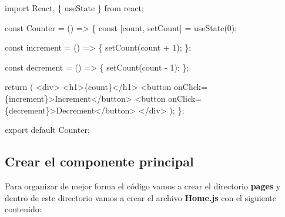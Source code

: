 \documentclass[
  a4paper,
  DIV=11,
  numbers=noendperiod,
  onepage,
  openany]{scrreprt}
\newenvironment{Shaded}{\begin{snugshade}}{\end{snugshade}}
\newcommand{\ControlFlowTok}[1]{\textcolor[rgb]{0.00,0.23,0.31}{#1}}
\newcommand{\DecValTok}[1]{\textcolor[rgb]{0.68,0.00,0.00}{#1}}
\newcommand{\FunctionTok}[1]{\textcolor[rgb]{0.28,0.35,0.67}{#1}}
\newcommand{\ImportTok}[1]{\textcolor[rgb]{0.00,0.46,0.62}{#1}}
\newcommand{\KeywordTok}[1]{\textcolor[rgb]{0.00,0.23,0.31}{#1}}
\newcommand{\NormalTok}[1]{\textcolor[rgb]{0.00,0.23,0.31}{#1}}
\newcommand{\OperatorTok}[1]{\textcolor[rgb]{0.37,0.37,0.37}{#1}}
\newcommand{\OtherTok}[1]{\textcolor[rgb]{0.00,0.23,0.31}{#1}}
\newcommand{\StringTok}[1]{\textcolor[rgb]{0.13,0.47,0.30}{#1}}
\newcommand{\VariableTok}[1]{\textcolor[rgb]{0.07,0.07,0.07}{#1}}
\begin{document}
\begin{Shaded}
\begin{Highlighting}[]
\ImportTok{import}\NormalTok{ React}\OperatorTok{,}\NormalTok{ \{ useState \} }\ImportTok{from} \StringTok{\textquotesingle{}react\textquotesingle{}}\OperatorTok{;}

\KeywordTok{const}\NormalTok{ Counter }\OperatorTok{=}\NormalTok{ () }\KeywordTok{=\textgreater{}}\NormalTok{ \{}
  \KeywordTok{const}\NormalTok{ [count}\OperatorTok{,}\NormalTok{ setCount] }\OperatorTok{=} \FunctionTok{useState}\NormalTok{(}\DecValTok{0}\NormalTok{)}\OperatorTok{;}

  \KeywordTok{const}\NormalTok{ increment }\OperatorTok{=}\NormalTok{ () }\KeywordTok{=\textgreater{}}\NormalTok{ \{}
    \FunctionTok{setCount}\NormalTok{(count }\OperatorTok{+} \DecValTok{1}\NormalTok{)}\OperatorTok{;}
\NormalTok{  \}}\OperatorTok{;}

  \KeywordTok{const}\NormalTok{ decrement }\OperatorTok{=}\NormalTok{ () }\KeywordTok{=\textgreater{}}\NormalTok{ \{}
    \FunctionTok{setCount}\NormalTok{(count }\OperatorTok{{-}} \DecValTok{1}\NormalTok{)}\OperatorTok{;}
\NormalTok{  \}}\OperatorTok{;}

  \ControlFlowTok{return}\NormalTok{ (}
    \KeywordTok{\textless{}div\textgreater{}}
      \KeywordTok{\textless{}h1\textgreater{}}\VariableTok{\{}\NormalTok{count}\VariableTok{\}}\KeywordTok{\textless{}/h1\textgreater{}}
      \KeywordTok{\textless{}button} \OtherTok{onClick}\OperatorTok{=}\VariableTok{\{}\NormalTok{increment}\VariableTok{\}}\KeywordTok{\textgreater{}}\NormalTok{Increment}\KeywordTok{\textless{}/button\textgreater{}}
      \KeywordTok{\textless{}button} \OtherTok{onClick}\OperatorTok{=}\VariableTok{\{}\NormalTok{decrement}\VariableTok{\}}\KeywordTok{\textgreater{}}\NormalTok{Decrement}\KeywordTok{\textless{}/button\textgreater{}}
    \KeywordTok{\textless{}/div\textgreater{}}
\NormalTok{  )}\OperatorTok{;}
\NormalTok{\}}\OperatorTok{;}

\ImportTok{export} \ImportTok{default}\NormalTok{ Counter}\OperatorTok{;}
\end{Highlighting}
\end{Shaded}

\subsection{Crear el componente
principal}\label{crear-el-componente-principal}

Para organizar de mejor forma el código vamos a crear el directorio
\textbf{pages} y dentro de este directorio vamos a crear el archivo
\textbf{Home.js} con el siguiente contenido:
\end{document}

